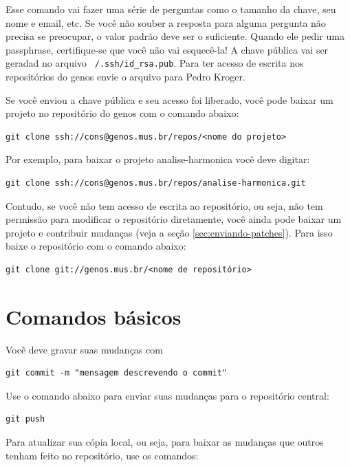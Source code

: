\documentclass[12pt,brazil]{book}
\begin{document}
Esse comando vai fazer uma série de perguntas como o tamanho da chave,
seu nome e email, etc. Se você não souber a resposta para alguma
pergunta não precisa se preocupar, o valor padrão deve ser o
suficiente. Quando ele pedir uma passphrase, certifique-se que você
não vai esquecê-la! A chave pública vai ser geradad no arquivo
\texttt{~/.ssh/id\_rsa.pub}. Para ter acesso de escrita nos
repositórios do genos envie o arquivo para Pedro Kroger.

Se você enviou a chave pública e seu acesso foi liberado, você pode
baixar um projeto no repositório do genos com o comando abaixo:

\begin{verbatim}
git clone ssh://cons@genos.mus.br/repos/<nome do projeto>
\end{verbatim}

Por exemplo, para baixar o projeto analise-harmonica você deve
digitar:

\begin{verbatim}
git clone ssh://cons@genos.mus.br/repos/analise-harmonica.git
\end{verbatim}

Contudo, se você não tem acesso de escrita ao repositório, ou seja,
não tem permissão para modificar o repositório diretamente, você ainda
pode baixar um projeto e contribuir mudanças (veja a seção
\ref{sec:enviando-patches}). Para isso baixe o repositório com o
comando abaixo:

\begin{verbatim}
git clone git://genos.mus.br/<nome de repositório>
\end{verbatim}

\section{Comandos básicos}
\label{sec:comandos-basicos}

Você deve gravar suas mudanças com

\begin{verbatim}
git commit -m "mensagem descrevendo o commit"
\end{verbatim}

Use o comando abaixo para enviar suas mudanças para o repositório
central:

\begin{verbatim}
git push
\end{verbatim}

Para atualizar sua cópia local, ou seja, para baixar as mudanças que
outros tenham feito no repositório, use os comandos:
\end{document}
